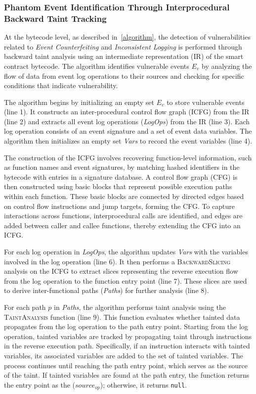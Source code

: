 \subsubsection{Phantom Event Identification Through Interprocedural Backward Taint Tracking}
At the bytecode level, as described in~\cref{algorithm}, the detection of vulnerabilities related to \emph{Event Counterfeiting} and \emph{Inconsistent Logging} is performed through backward taint analysis using an intermediate representation (IR) of the smart contract bytecode. The algorithm identifies vulnerable events \(E_v\) by analyzing the flow of data from event log operations to their sources and checking for specific conditions that indicate vulnerability.

The algorithm begins by initializing an empty set \(E_v\) to store vulnerable events (line 1). It constructs an inter-procedural control flow graph (ICFG) from the IR (line 2) and extracts all event log operations (\textit{LogOps}) from the IR (line 3). Each log operation consists of an event signature and a set of event data variables. The algorithm then initializes an empty set \textit{Vars} to record the event variables (line 4).

The construction of the ICFG involves recovering function-level information, such as function names and event signatures, by matching hashed identifiers in the bytecode with entries in a signature database. A control flow graph (CFG) is then constructed using basic blocks that represent possible execution paths within each function. These basic blocks are connected by directed edges based on control flow instructions and jump targets, forming the CFG. To capture interactions across functions, interprocedural calls are identified, and edges are added between caller and callee functions, thereby extending the CFG into an ICFG. 

For each log operation in \textit{LogOps}, the algorithm updates \textit{Vars} with the variables involved in the log operation (line 6). It then performs a \textsc{BackwardSlicing} analysis on the ICFG to extract slices representing the reverse execution flow from the log operation to the function entry point (line 7). These slices are used to derive inter-functional paths (\textit{Paths}) for further analysis (line 8).

For each path \(p\) in \textit{Paths}, the algorithm performs taint analysis using the \textsc{TaintAnalysis} function (line 9). This function evaluates whether tainted data propagates from the log operation to the path entry point. Starting from the log operation, tainted variables are tracked by propagating taint through instructions in the reverse execution path. Specifically, if an instruction interacts with tainted variables, its associated variables are added to the set of tainted variables. The process continues until reaching the path entry point, which serves as the source of the taint. If tainted variables are found at the path entry, the function returns the entry point as the (\(source_{op}\)); otherwise, it returns \texttt{null}.

